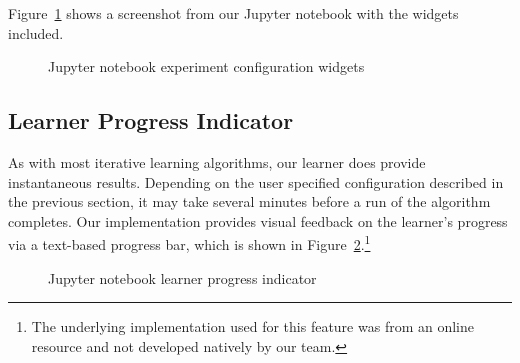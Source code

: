 \documentclass{report}
\begin{document}
  Figure~\ref{fig:jupyterWidgets} shows a screenshot from our Jupyter notebook with the widgets included.
    
  \begin{figure}[tb]
    \centering
    \caption{Jupyter notebook experiment configuration widgets}\label{fig:jupyterWidgets}
  \end{figure}

  \subsection{Learner Progress Indicator}
  
  As with most iterative learning algorithms, our learner does provide instantaneous results.  Depending on the user specified configuration described in the previous section, it may take several minutes before a run of the algorithm completes.  Our implementation provides visual feedback on the learner's progress via a text-based progress bar, which is shown in Figure~\ref{fig:jupyterProgressBar}.\footnote{The underlying implementation used for this feature was from an online resource and not developed natively by our team.}
  
  \begin{figure}[tb]
    \centering
    \caption{Jupyter notebook learner progress indicator}\label{fig:jupyterProgressBar}
  \end{figure}
\end{document}
